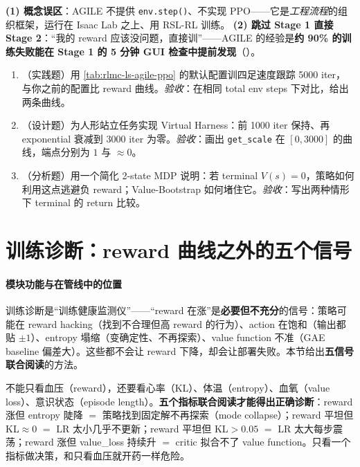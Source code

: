 \begin{pitfall}
\textbf{(1) 概念误区}：AGILE 不提供 \verb|env.step()|、不实现 PPO——它是\emph{工程流程}的组织框架，运行在 Isaac Lab 之上、用 RSL-RL 训练。
\textbf{(2) 跳过 Stage 1 直接 Stage 2}：“我的 reward 应该没问题，直接训”——AGILE 的经验是\textbf{约 90\% 的训练失败能在 Stage 1 的 5 分钟 GUI 检查中提前发现}（）。
\end{pitfall}

\begin{practice}[AGILE 练习]
\begin{enumerate}
\item （实践题）用 \cref{tab:rlmc-ls-agile-ppo} 的默认配置训四足速度跟踪 5000 iter，与你之前的配置比 reward 曲线。\emph{验收}：在相同 total env steps 下对比，给出两条曲线。
\item （设计题）为人形站立任务实现 Virtual Harness：前 1000 iter 保持、再 exponential 衰减到 3000 iter 为零。\emph{验收}：画出 \verb|get_scale| 在 $[0,3000]$ 的曲线，端点分别为 $1$ 与 $\approx0$。
\item （分析题）用一个简化 2-state MDP 说明：若 terminal $V(s)=0$，策略如何利用这点逃避负 reward；Value-Bootstrap 如何堵住它。\emph{验收}：写出两种情形下 terminal 的 return 比较。
\end{enumerate}
\end{practice}

\section{训练诊断：reward 曲线之外的五个信号}
\label{sec:rlmc-ls-diag}

\paragraph{\texorpdfstring{ 模块功能与在管线中的位置}{1 模块功能与在管线中的位置}}训练诊断是“训练健康监测仪”——“reward 在涨”是\textbf{必要但不充分}的信号：策略可能在 reward hacking（找到不合理但高 reward 的行为）、action 在饱和（输出都贴 $\pm1$）、entropy 塌缩（变确定性、不再探索）、value function 不准（GAE baseline 偏差大）。这些都不会让 reward 下降，却会让部署失败。本节给出\textbf{五信号联合阅读}的方法。

\begin{insight}\label{ins:rlmc-ls-diag}
不能只看血压（reward），还要看心率（KL）、体温（entropy）、血氧（value loss）、意识状态（episode length）。\textbf{五个指标联合阅读才能得出正确诊断}：reward 涨但 entropy 陡降 $=$ 策略找到固定解不再探索（mode collapse）；reward 平坦但 KL$\approx 0$ $=$ LR 太小几乎不更新；reward 平坦但 KL$>0.05$ $=$ LR 太大每步震荡；reward 涨但 value\_loss 持续升 $=$ critic 拟合不了 value function。只看一个指标做决策，和只看血压就开药一样危险。
\end{insight}

